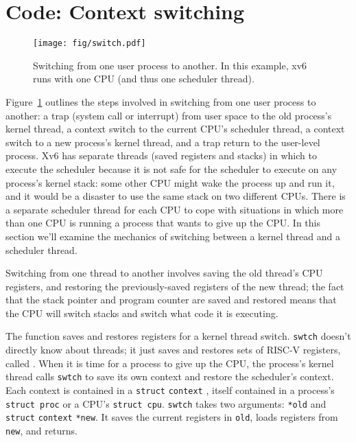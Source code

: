 \section{Code: Context switching}

\begin{figure}[t]
\center
\texttt{[image: fig/switch.pdf]}
\caption{Switching from one user process to another.  In this example, xv6 runs with one CPU (and thus one scheduler thread).}
\label{fig:switch}
\end{figure}

Figure~\ref{fig:switch} 
outlines the steps involved in switching from one
user process to another:
a trap (system
call or interrupt) from user space to the old process's kernel thread,
a context switch to the current CPU's scheduler thread, a context
switch to a new process's kernel thread, and a trap return
to the user-level process.
Xv6 has separate threads
(saved registers and stacks)
in which to execute the scheduler because
it is not safe for the scheduler to execute on
any process's kernel stack: some other CPU might
wake the process up and run it, and it would be a disaster
to use the same stack on two different CPUs.
There is a separate scheduler thread for each CPU to cope
with situations in which more than one CPU is running
a process that wants to give up the CPU.
%
%
%
In this section we'll examine the mechanics of switching
between a kernel thread and a scheduler thread.

Switching from one thread to another involves saving the old thread's
CPU registers, and restoring the previously-saved registers of the
new thread; the fact that
the stack pointer and program counter
are saved and restored means that the CPU will switch stacks and
switch what code it is executing.

The function
saves and restores registers for a kernel thread switch.
\lstinline{swtch}
doesn't directly know about threads; it just saves and
restores sets of RISC-V registers, called 
.
When it is time for a process to give up the CPU,
the process's kernel thread calls
\lstinline{swtch}
to save its own context and restore the scheduler's context.
Each context is contained in a
\lstinline{struct}
\lstinline{context}
,
itself contained in a process's
\lstinline{struct proc}
or a CPU's
\lstinline{struct cpu}.
\lstinline{swtch}
takes two arguments:
\lstinline{*old}
and
\lstinline{struct}
\lstinline{context}
\lstinline{*new}.
It saves the current registers in
\lstinline{old},
loads registers from 
\lstinline{new},
and returns.

